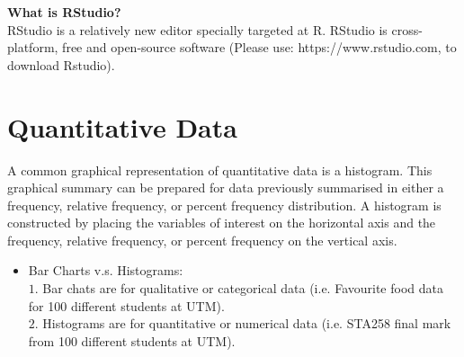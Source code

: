 \noindent
\textbf{What is RStudio?}\\
RStudio is a relatively new editor specially targeted at R. RStudio is cross-platform, free and open-source software (Please use: https://www.rstudio.com, to download Rstudio).

\newpage

\section{Quantitative Data}

A common graphical representation of quantitative data is a histogram. This graphical summary can be prepared for data previously summarised in either a frequency, relative frequency, or percent frequency distribution. A histogram is constructed by placing the variables of interest on the horizontal axis and the frequency, relative frequency, or percent frequency on the vertical axis.
\\

\begin{itemize}
	\item Bar Charts v.s. Histograms: \\
	$1.$ Bar chats are for qualitative or categorical data (i.e. Favourite food data for 100 different students at UTM). \\
	$2.$ Histograms are for quantitative or numerical data (i.e. STA258 final mark from 100 different students at UTM).
\end{itemize}

